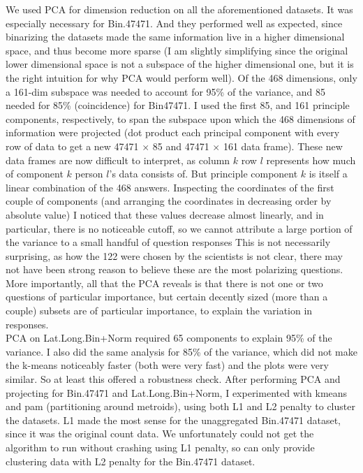 \documentclass{article}\usepackage[]{graphicx}\usepackage[]{color}
\begin{document}
We used PCA for dimension reduction on all the aforementioned datasets.  It was especially necessary for Bin.47471.  And they performed well as expected, since binarizing the datasets made the same information live in a higher dimensional space, and thus become more sparse (I am slightly simplifying since the original lower dimensional space is not a subspace of the higher dimensional one, but it is the right intuition for why PCA would perform well).  Of the 468 dimensions, only a 161-dim subspace was needed to account for 95\% of the variance, and 85 needed for 85\% (coincidence) for Bin47471.  I used the first 85, and 161 principle components, respectively, to span the subspace upon which the 468 dimensions of information were projected (dot product each principal component with every row of data to get a new 47471 $\times$ 85 and 47471 $\times$ 161 data frame).  These new data frames are now difficult to interpret, as column $k$ row $l$ represents how much of component $k$ person $l$'s data consists of.  But principle component $k$ is itself a linear combination of the 468 answers.  Inspecting the coordinates of the first couple of components (and arranging the coordinates in decreasing order by absolute value) I noticed that these values decrease almost linearly, and in particular, there is no noticeable cutoff, so we cannot attribute a large portion of the variance to a small  handful of question responses  This is not necessarily surprising, as how the 122 were chosen by the scientists is not clear, there may not have been strong reason to believe these are the most polarizing questions.  More importantly, all that the PCA reveals is that there is not one or two questions of particular importance, but certain decently sized (more than a couple) subsets are of particular importance, to explain the variation in responses.  \\

PCA on Lat.Long.Bin+Norm required 65 components to explain 95\% of the variance.  I also did the same analysis for 85\% of the variance, which did not make the k-means noticeably faster (both were very fast) and the plots were very similar.  So at least this offered a robustness check.  After performing PCA and projecting for Bin.47471 and Lat.Long.Bin+Norm, I experimented with kmeans and pam (partitioning around metroids), using both L1 and L2 penalty to cluster the datasets.  L1 made the most sense for the unaggregated Bin.47471 dataset, since it was the original count data.  We unfortunately could not get the algorithm to run without crashing using L1 penalty, so can only provide clustering data with L2 penalty for the Bin.47471 dataset.\\
\end{document}
